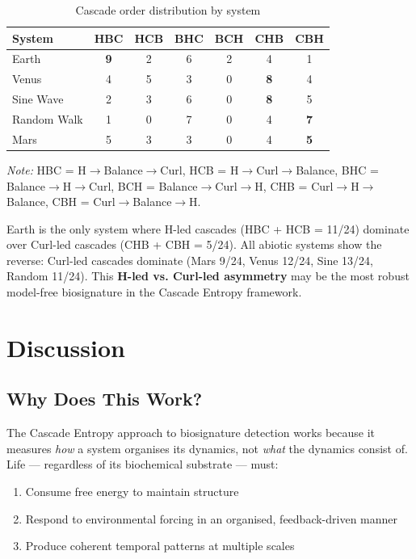 \documentclass[12pt,a4paper]{article}
\begin{document}
\begin{table}[htbp]
  \centering
  \caption{Cascade order distribution by system}
  \label{tab:orders}
  \begin{tabular}{lcccccc}
    \toprule
    \textbf{System} & \textbf{HBC} & \textbf{HCB} & \textbf{BHC} &
    \textbf{BCH} & \textbf{CHB} & \textbf{CBH} \\
    \midrule
    Earth & \textbf{9} & 2 & 6 & 2 & 4 & 1 \\
    Venus & 4 & 5 & 3 & 0 & \textbf{8} & 4 \\
    Sine Wave & 2 & 3 & 6 & 0 & \textbf{8} & 5 \\
    Random Walk & 1 & 0 & 7 & 0 & 4 & \textbf{7} \\
    Mars & 5 & 3 & 3 & 0 & 4 & \textbf{5} \\
    \bottomrule
  \end{tabular}
\end{table}

\noindent
\textit{Note:} HBC = H$\rightarrow$Balance$\rightarrow$Curl,
HCB = H$\rightarrow$Curl$\rightarrow$Balance,
BHC = Balance$\rightarrow$H$\rightarrow$Curl,
BCH = Balance$\rightarrow$Curl$\rightarrow$H,
CHB = Curl$\rightarrow$H$\rightarrow$Balance,
CBH = Curl$\rightarrow$Balance$\rightarrow$H.

Earth is the only system where H-led cascades (HBC + HCB = 11/24) dominate
over Curl-led cascades (CHB + CBH = 5/24). All abiotic systems show the
reverse: Curl-led cascades dominate (Mars 9/24, Venus 12/24, Sine 13/24,
Random 11/24). This \textbf{H-led vs. Curl-led asymmetry} may be the most
robust model-free biosignature in the Cascade Entropy framework.

\section{Discussion}

\subsection{Why Does This Work?}

The Cascade Entropy approach to biosignature detection works because it
measures \emph{how} a system organises its dynamics, not \emph{what} the
dynamics consist of. Life --- regardless of its biochemical substrate ---
must:

\begin{enumerate}[leftmargin=*]
  \item Consume free energy to maintain structure
  \item Respond to environmental forcing in an organised,
    feedback-driven manner
  \item Produce coherent temporal patterns at multiple scales
\end{enumerate}
\end{document}
